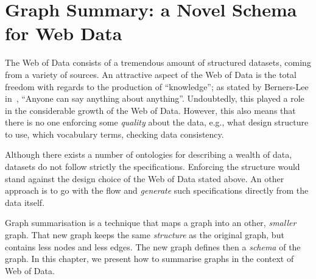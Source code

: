 \chapter{Graph Summary: a Novel Schema for Web Data}
\label{chap:summary}

The Web of Data consists of a tremendous amount of structured datasets, coming from a variety of sources. An attractive aspect of the Web of Data is the total freedom with regards to the production of ``knowledge''; as stated by Berners-Lee in~\cite{tbl:1997:wam}, ``Anyone can say anything about anything''. Undoubtedly, this played a role in the considerable growth of the Web of Data. However, this also means that there is no one enforcing some \emph{quality} about the data, e.g., what design structure to use, which vocabulary terms, checking data consistency.

Although there exists a number of ontologies for describing a wealth of data, datasets do not follow strictly the specifications. Enforcing the structure would stand against the design choice of the Web of Data stated above. An other approach is to go with the flow and \emph{generate} such specifications directly from the data itself.

Graph summarisation is a technique that maps a graph into an other, \emph{smaller} graph. That new graph keeps the same \emph{structure} as the original graph, but contains less nodes and less edges. The new graph defines then a \emph{schema} of the graph. In this chapter, we present how to summarise graphs in the context of Web of Data.
